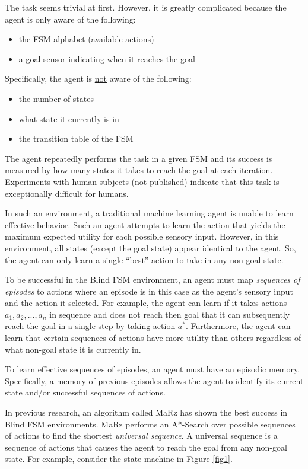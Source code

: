 \documentclass[letterpaper]{article} %
\begin{document}
The task seems trivial at first.  However, it is greatly complicated
because the agent is only aware of the following:
\begin{itemize}
\item the FSM alphabet (available actions)
\item a goal sensor indicating when it reaches the goal
\end{itemize}

\bigskip  %

Specifically, the agent is \underline{not} aware of the following:
\begin{itemize}
\item the number of states
\item what state it currently is in
\item the transition table of the FSM
\end{itemize}

The agent repeatedly performs the task in a given FSM and its success
is measured by how many states it takes to reach the goal at each
iteration.  Experiments with human subjects (not published) indicate
that this task is exceptionally difficult for humans.

In such an environment, a traditional machine learning agent is unable
to learn effective behavior.  Such an agent attempts to learn the
action that yields the maximum expected utility for each possible
sensory input.  However, in this environment, all states (except the
goal state) appear identical to the agent.  So, the agent can only
learn a single ``best'' action to take in any non-goal state.

To be successful in the Blind FSM environment, an agent must map
\textit{sequences of episodes} to actions where an episode is in this
case as the agent's sensory input and the action it selected.  For
example, the agent can learn if it takes actions $a_1, a_2, ..., a_n$
in sequence and does not reach then goal that it can subsequently
reach the goal in a single step by taking action $a^*$.  Furthermore,
the agent can learn that certain sequences of actions have more
utility than others regardless of what non-goal state it is currently
in.

To learn effective sequences of episodes, an agent must have an
episodic memory.  Specifically, a memory of previous episodes allows
the agent to identify its current state and/or successful sequences of
actions.

In previous research, an algorithm called MaRz \cite{Rodriguez17} has
shown the best success in Blind FSM environments.  MaRz performs an
A*-Search \cite{Russell09}over possible sequences of actions to find
the shortest \textit{universal sequence}.  A universal sequence is a
sequence of actions that causes the agent to reach the goal from any
non-goal state.  For example, consider the state machine in
Figure \ref{fig1}.
\end{document}
